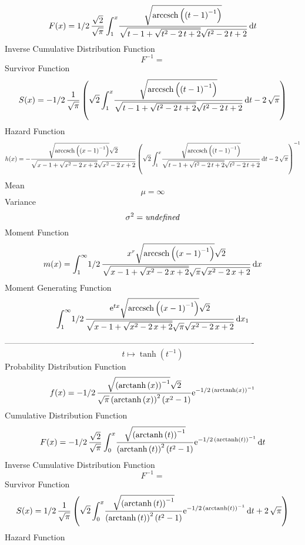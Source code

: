 \documentclass[12pt]{article}
\begin{document}
 $$F(x)=1/2\,{\frac {\sqrt {2}}{\sqrt {\pi}}\int_{1}^{x}\!{\frac {\sqrt {
{\rm arccsch} \left( \left( t-1 \right) ^{-1}\right)}}{\sqrt {t-1+
\sqrt {{t}^{2}-2\,t+2}}\sqrt {{t}^{2}-2\,t+2}}}\,{\rm d}t}
$$ Inverse Cumulative Distribution Function 
  $$F^{-1} = $$Survivor Function 
 $$ S(x)=-1/2\,{\frac {1}{\sqrt {\pi}} \left( \sqrt {2}\int_{1}^{x}\!{\frac {
\sqrt {{\rm arccsch} \left( \left( t-1 \right) ^{-1}\right)}}{\sqrt {t
-1+\sqrt {{t}^{2}-2\,t+2}}\sqrt {{t}^{2}-2\,t+2}}}\,{\rm d}t-2\,\sqrt 
{\pi} \right) }
$$ Hazard Function 
 $$ h(x)=-{\frac {\sqrt {{\rm arccsch} \left( \left( x-1 \right) ^{-1}\right)}
\sqrt {2}}{\sqrt {x-1+\sqrt {{x}^{2}-2\,x+2}}\sqrt {{x}^{2}-2\,x+2}}
 \left( \sqrt {2}\int_{1}^{x}\!{\frac {\sqrt {{\rm arccsch} \left(
 \left( t-1 \right) ^{-1}\right)}}{\sqrt {t-1+\sqrt {{t}^{2}-2\,t+2}}
\sqrt {{t}^{2}-2\,t+2}}}\,{\rm d}t-2\,\sqrt {\pi} \right) ^{-1}}
$$Mean 
 $$ \mu=\infty 
$$ Variance 
 $$ \sigma^2 = {\it undefined}
$$Moment Function 
 $$ m(x) = \int_{1}^{\infty }\!1/2\,{\frac {{x}^{r}\sqrt {{\rm arccsch} \left(
 \left( x-1 \right) ^{-1}\right)}\sqrt {2}}{\sqrt {x-1+\sqrt {{x}^{2}-
2\,x+2}}\sqrt {\pi}\sqrt {{x}^{2}-2\,x+2}}}\,{\rm d}x
$$ Moment Generating Function 
 $$\int_{1}^{\infty }\!1/2\,{\frac {{{\rm e}^{tx}}\sqrt {{\rm arccsch} 
\left( \left( x-1 \right) ^{-1}\right)}\sqrt {2}}{\sqrt {x-1+\sqrt {{x
}^{2}-2\,x+2}}\sqrt {\pi}\sqrt {{x}^{2}-2\,x+2}}}\,{\rm d}x_{{1}}
$$-------------------------------------------------------------------------------------------  \\$$t\mapsto \tanh \left( {t}^{-1} \right) 
$$Probability Distribution Function 
$$  f(x)=-1/2\,{\frac {\sqrt { \left( {\rm arctanh} \left(x\right) \right) ^{-1
}}\sqrt {2}}{\sqrt {\pi} \left( {\rm arctanh} \left(x\right) \right) ^
{2} \left( {x}^{2}-1 \right) }{{\rm e}^{-1/2\, \left( {\rm arctanh} 
\left(x\right) \right) ^{-1}}}}
$$Cumulative Distribution Function  
 $$F(x)=-1/2\,{\frac {\sqrt {2}}{\sqrt {\pi}}\int_{0}^{x}\!{\frac {\sqrt {
 \left( {\rm arctanh} \left(t\right) \right) ^{-1}}}{ \left( 
{\rm arctanh} \left(t\right) \right) ^{2} \left( {t}^{2}-1 \right) }{
{\rm e}^{-1/2\, \left( {\rm arctanh} \left(t\right) \right) ^{-1}}}}
\,{\rm d}t}
$$ Inverse Cumulative Distribution Function 
  $$F^{-1} = $$Survivor Function 
 $$ S(x)=1/2\,{\frac {1}{\sqrt {\pi}} \left( \sqrt {2}\int_{0}^{x}\!{\frac {
\sqrt { \left( {\rm arctanh} \left(t\right) \right) ^{-1}}}{ \left( 
{\rm arctanh} \left(t\right) \right) ^{2} \left( {t}^{2}-1 \right) }{
{\rm e}^{-1/2\, \left( {\rm arctanh} \left(t\right) \right) ^{-1}}}}
\,{\rm d}t+2\,\sqrt {\pi} \right) }
$$ Hazard Function 
\end{document}
